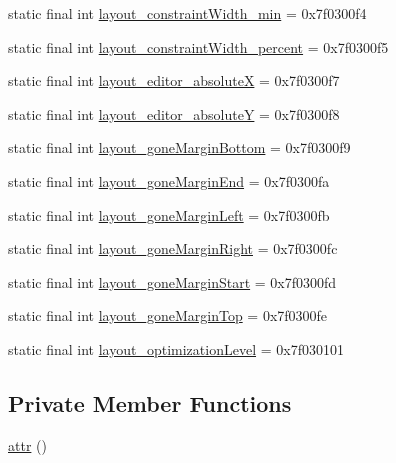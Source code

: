 \begin{DoxyCompactItemize}
\item 
static final int \mbox{\hyperlink{classandroid_1_1support_1_1constraint_1_1_r_1_1attr_a5a49ae2c12f8ebb4a81668e22b8235e6}{layout\+\_\+constraint\+Width\+\_\+min}} = 0x7f0300f4
\item 
static final int \mbox{\hyperlink{classandroid_1_1support_1_1constraint_1_1_r_1_1attr_ad70d80f598c0792a189aa7c83fdf3083}{layout\+\_\+constraint\+Width\+\_\+percent}} = 0x7f0300f5
\item 
static final int \mbox{\hyperlink{classandroid_1_1support_1_1constraint_1_1_r_1_1attr_aecc960b1c8892a8b2c19ddb7d00f262d}{layout\+\_\+editor\+\_\+absoluteX}} = 0x7f0300f7
\item 
static final int \mbox{\hyperlink{classandroid_1_1support_1_1constraint_1_1_r_1_1attr_aac2297ccf772fd1991195749704e4337}{layout\+\_\+editor\+\_\+absoluteY}} = 0x7f0300f8
\item 
static final int \mbox{\hyperlink{classandroid_1_1support_1_1constraint_1_1_r_1_1attr_a2128b9a34152b6fc809a6e98756aa42f}{layout\+\_\+gone\+Margin\+Bottom}} = 0x7f0300f9
\item 
static final int \mbox{\hyperlink{classandroid_1_1support_1_1constraint_1_1_r_1_1attr_acf5bd3ce26104fd5dfb21dad85209190}{layout\+\_\+gone\+Margin\+End}} = 0x7f0300fa
\item 
static final int \mbox{\hyperlink{classandroid_1_1support_1_1constraint_1_1_r_1_1attr_a543e9fcd439ae384cc82f0f49b6fef9c}{layout\+\_\+gone\+Margin\+Left}} = 0x7f0300fb
\item 
static final int \mbox{\hyperlink{classandroid_1_1support_1_1constraint_1_1_r_1_1attr_ab245b747bb3e00d536dd43ad6a0e8df8}{layout\+\_\+gone\+Margin\+Right}} = 0x7f0300fc
\item 
static final int \mbox{\hyperlink{classandroid_1_1support_1_1constraint_1_1_r_1_1attr_a2cd31cc38cd7d52e34e96ab00ab2d85e}{layout\+\_\+gone\+Margin\+Start}} = 0x7f0300fd
\item 
static final int \mbox{\hyperlink{classandroid_1_1support_1_1constraint_1_1_r_1_1attr_a305701c04de581e4593ac38844061adc}{layout\+\_\+gone\+Margin\+Top}} = 0x7f0300fe
\item 
static final int \mbox{\hyperlink{classandroid_1_1support_1_1constraint_1_1_r_1_1attr_a54cee958221f1d1e32255db5fa73d364}{layout\+\_\+optimization\+Level}} = 0x7f030101
\end{DoxyCompactItemize}
\subsection*{Private Member Functions}
\begin{DoxyCompactItemize}
\item 
\mbox{\hyperlink{classandroid_1_1support_1_1constraint_1_1_r_1_1attr_a65d388aaf0b91329c610afdc4c050fcb}{attr}} ()
\end{DoxyCompactItemize}


